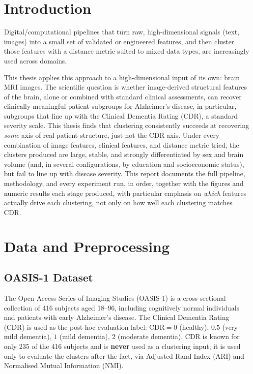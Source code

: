 \documentclass[11pt, a4paper]{article}
\begin{document}
\section{Introduction}

Digital/computational pipelines that turn raw, high-dimensional signals (text, images) into a small
set of validated or engineered features, and then cluster those features with a distance metric
suited to mixed data types, are increasingly used across domains.

This thesis applies this approach to a high-dimensional input of its own: brain MRI images. The scientific question is whether
image-derived structural features of the brain, alone or combined with standard clinical
assessments, can recover clinically meaningful patient subgroups for Alzheimer's disease, in
particular, subgroups that line up with the Clinical Dementia Rating (CDR), a standard severity
scale. This thesis finds that clustering consistently
succeeds at recovering \emph{some} axis of real patient structure, just not the CDR axis.
Under every combination of image features, clinical features, and distance metric tried, the
clusters produced are large, stable, and strongly differentiated by sex and brain volume (and, in
several configurations, by education and socioeconomic status), but fail to line up with disease
severity. This report documents the full pipeline, methodology, and every experiment run, in order,
together with the figures and numeric results each stage produced, with particular emphasis on
\emph{which} features actually drive each clustering, not only on how well each clustering matches
CDR.

\section{Data and Preprocessing}

\subsection{OASIS-1 Dataset}
The Open Access Series of Imaging Studies (OASIS-1) is a cross-sectional collection of 416 subjects
aged 18--96, including cognitively normal individuals and patients with early Alzheimer's disease.
The Clinical Dementia Rating (CDR) is used as the post-hoc evaluation label:
$\mathrm{CDR}=0$ (healthy), $0.5$ (very mild dementia), $1$ (mild dementia), $2$ (moderate dementia).
CDR is known for only 235 of the 416 subjects and is \textbf{never} used as a clustering input;
it is used only to evaluate the clusters after the fact, via Adjusted Rand Index (ARI) and
Normalised Mutual Information (NMI).
\end{document}
